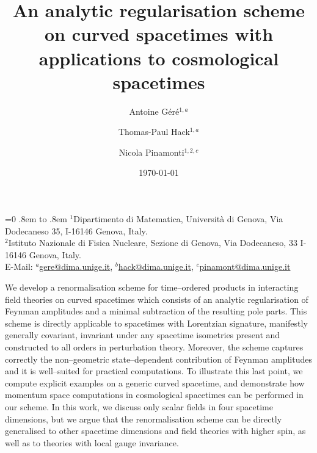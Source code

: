 \documentclass[a4paper,10pt,twoside]{article}
\makeatletter
\let\maybesf\sffamily
\let\maybesf\rmfamily
\numberwithin{equation}{section}
\newcounter{and}
\newcommand{\institute}[1]{\newcommand{\@institute}{#1}}
\newcommand{\email}[1]{\href{mailto:#1}{#1}}
\renewcommand{\maketitle}{
  { %
    \raggedright
    \LARGE
    \noindent
    \bfseries
    \maybesf
    \@title
    \par
  }

  \vspace{1.5\baselineskip}

  { %
    \raggedright
    \renewcommand{\and}{
      \unskip, \ignorespaces
    }
    \noindent\ignorespaces\@author\par
  }

  \vspace{0.5\baselineskip}

  { %
    \raggedright
    \small
    \renewcommand{\and}{
      \par\stepcounter{and}
      \hangindent .8em\noindent
      \hbox to .8em{\smash{$^{\arabic{and}}$}}\ignorespaces
    }
    \ifnum\value{and}=0
      \noindent
    \else
      \hangindent .8em\noindent
      \hbox to .8em{\smash{$^{\arabic{and}}$}}\ignorespaces
    \fi
    \ignorespaces\@institute\par
  }

  \vspace{1.0\baselineskip}
 
  { %
    \raggedright
    \noindent\ignorespaces\@date\par
  }

}
\renewenvironment{abstract}{
  \addvspace{1.5\baselineskip}
  \topsep=0pt\partopsep=0pt
  \trivlist\item[\hskip\labelsep\bfseries\maybesf Abstract.]
}{}
\theoremstyle{plain}
\theoremstyle{definition}
\makeatother
\begin{document}

\title{An analytic regularisation scheme on curved spacetimes with applications to cosmological spacetimes}

\author{
  Antoine G\'er\'e$^{1,a}$\and
  Thomas-Paul Hack$^{1,a}$\and
  Nicola Pinamonti$^{1,2,c}$
}

\institute{
  $^1$Dipartimento di Matematica, Universit\`a  di Genova, Via Dodecaneso 35,
  I-16146 Genova, Italy.\\
  $^2$Istituto Nazionale di Fisica Nucleare, Sezione di Genova, Via Dodecaneso, 33 I-16146 Genova, Italy.\\
  E-Mail: \email{$^a$gere@dima.unige.it}, \email{$^b$hack@dima.unige.it}, \email{$^c$pinamont@dima.unige.it}
}

\date{\today}

\maketitle


\begin{abstract}We develop a renormalisation scheme for time--ordered products in interacting field theories on curved spacetimes which consists of an analytic regularisation of Feynman amplitudes and a minimal subtraction of the resulting pole parts. This scheme is directly applicable to spacetimes with Lorentzian signature, manifestly generally covariant, invariant under any spacetime isometries present and constructed to all orders in perturbation theory. Moreover, the scheme captures correctly the non--geometric state--dependent contribution of Feynman amplitudes and it is well--suited for practical computations. To illustrate this last point, we compute explicit examples on a generic curved spacetime, and demonstrate how momentum space computations in cosmological spacetimes can be performed in our scheme. In this work, we discuss only scalar fields in four spacetime dimensions, but we argue that the renormalisation scheme can be directly generalised to other spacetime dimensions and field theories with higher spin, as well as to theories with local gauge invariance. 
\end{abstract}

\end{document}
